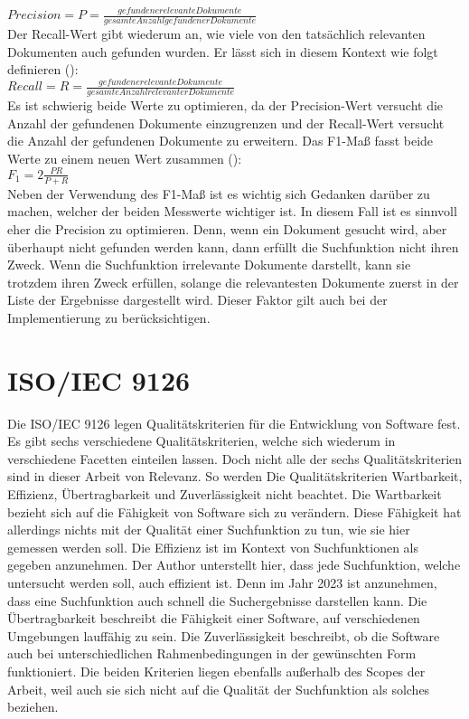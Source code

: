\(Precision=P=\frac{gefundene relevante Dokumente}{gesamte Anzahl gefundener Dokumente} \)\\

Der Recall-Wert gibt wiederum an, wie viele von den tatsächlich relevanten Dokumenten auch gefunden wurden.
Er lässt sich in diesem Kontext wie folgt definieren (\cite{Sirotkin_2012}):\\

\(Recall=R=\frac{gefundene relevante Dokumente}{gesamte Anzahl relevanter Dokumente}\)\\

Es ist schwierig beide Werte zu optimieren, da der Precision-Wert versucht die Anzahl der gefundenen Dokumente einzugrenzen und der Recall-Wert versucht die Anzahl der gefundenen Dokumente zu erweitern.
Das F1-Maß fasst beide Werte zu einem neuen Wert zusammen (\cite{Sirotkin_2012}):\\

\(F_1=2\frac{PR}{P+R}\)\\

Neben der Verwendung des F1-Maß ist es wichtig sich Gedanken darüber zu machen, welcher der beiden Messwerte wichtiger ist.
In diesem Fall ist es sinnvoll eher die Precision zu optimieren.
Denn, wenn ein Dokument gesucht wird, aber überhaupt nicht gefunden werden kann, dann erfüllt die Suchfunktion nicht ihren Zweck.
Wenn die Suchfunktion irrelevante Dokumente darstellt, kann sie trotzdem ihren Zweck erfüllen, solange die relevantesten Dokumente zuerst in der Liste der Ergebnisse dargestellt wird.
Dieser Faktor gilt auch bei der Implementierung zu berücksichtigen.

\section{ISO/IEC 9126}
Die ISO/IEC 9126 legen Qualitätskriterien für die Entwicklung von Software fest.
Es gibt sechs verschiedene Qualitätskriterien, welche sich wiederum in verschiedene Facetten einteilen lassen.
Doch nicht alle der sechs Qualitätskriterien sind in dieser Arbeit von Relevanz.
So werden Die Qualitätskriterien Wartbarkeit, Effizienz, Übertragbarkeit und Zuverlässigkeit nicht beachtet.
Die Wartbarkeit bezieht sich auf die Fähigkeit von Software sich zu verändern.
Diese Fähigkeit hat allerdings nichts mit der Qualität einer Suchfunktion zu tun, wie sie hier gemessen werden soll.
Die Effizienz ist im Kontext von Suchfunktionen als gegeben anzunehmen.
Der Author unterstellt hier, dass jede Suchfunktion, welche untersucht werden soll, auch effizient ist.
Denn im Jahr 2023 ist anzunehmen, dass eine Suchfunktion auch schnell die Suchergebnisse darstellen kann.
Die Übertragbarkeit beschreibt die Fähigkeit einer Software, auf verschiedenen Umgebungen lauffähig zu sein.
Die Zuverlässigkeit beschreibt, ob die Software auch bei unterschiedlichen Rahmenbedingungen in der gewünschten Form funktioniert.
Die beiden Kriterien liegen ebenfalls außerhalb des Scopes der Arbeit, weil auch sie sich nicht auf die Qualität der Suchfunktion als solches beziehen.\\

